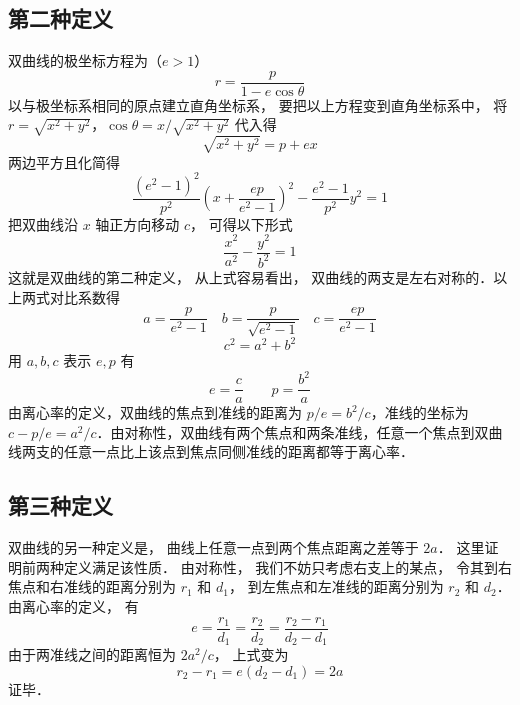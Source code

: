

\subsection{第二种定义}

双曲线的极坐标方程为（$e>1$）
\begin{equation}
r = \frac{p}{{1 - e\cos \theta }}
\end{equation}
以与极坐标系相同的原点建立直角坐标系， 要把以上方程变到直角坐标系中， 将$r = \sqrt {{x^2} + {y^2}}$，$\cos \theta  = x/\sqrt{x^2 + y^2}$ 代入得
\begin{equation}
\sqrt {{x^2} + {y^2}}  = p + ex
\end{equation}
两边平方且化简得
\begin{equation}
\frac{(e^2 - 1)^2}{p^2}{\left(x + \frac{ep}{e^2 - 1} \right)^2} - \frac{e^2 - 1}{p^2}y^2 = 1
\end{equation}
把双曲线沿 $x$ 轴正方向移动 $c$， 可得以下形式
\begin{equation}\label{Hypb3_eq4}
\frac{{{x^2}}}{{{a^2}}} - \frac{{{y^2}}}{{{b^2}}} = 1
\end{equation}
这就是双曲线的第二种定义， 从上式容易看出， 双曲线的两支是左右对称的．以上两式对比系数得
\begin{equation}
a = \frac{p}{{{e^2} - 1}} \quad  b = \frac{p}{{\sqrt {{e^2} - 1} }} \quad c = \frac{{ep}}{{{e^2} - 1}}
\end{equation}
\begin{equation}
c^2 = a^2 + b^2
\end{equation}
用 $a, b, c$ 表示 $e,p$ 有
\begin{equation}
e = \frac{c}{a} \qquad p = \frac{{{b^2}}}{a}
\end{equation}
由离心率的定义，双曲线的焦点到准线的距离为 $p/e=b^2/c$，准线的坐标为 $c-p/e = a^2/c$．由对称性，双曲线有两个焦点和两条准线，任意一个焦点到双曲线两支的任意一点比上该点到焦点同侧准线的距离都等于离心率．

\subsection{第三种定义}
双曲线的另一种定义是， 曲线上任意一点到两个焦点距离之差等于 $2a$． 这里证明前两种定义满足该性质． 由对称性， 我们不妨只考虑右支上的某点， 令其到右焦点和右准线的距离分别为 $r_1$ 和 $d_1$， 到左焦点和左准线的距离分别为 $r_2$ 和 $d_2$． 由离心率的定义， 有
\begin{equation}
e = \frac{r_1}{d_1} = \frac{r_2}{d_2} = \frac{r_2 - r_1}{d_2 - d_1}
\end{equation}
由于两准线之间的距离恒为 $2a^2/c$， 上式变为
\begin{equation}
r_2 - r_1 = e(d_2 - d_1) = 2a
\end{equation}
证毕．

